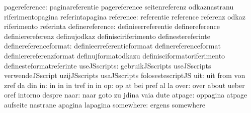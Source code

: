                    pagereference: paginareferentie                 pagereference
                                  seitenreferenz                   odkaznastranu
                                  riferimentopagina                referintapagina
                       reference: referentie                       reference
                                  referenz                         odkaz
                                  riferimento                      referinta
                 definereference: definieerreferentie              definereference
                                  definierereferenz                definujodkaz
                                  definisciriferimento             definestereferinte
           definereferenceformat: definieerreferentieformaat       definereferenceformat
                                  definierereferenzformat          definujformatodkazu
                                  definisciformatoriferimento      definesteformatreferinte
                    useJSscripts: gebruikJSscripts                 useJSscripts
                                  verwendeJSscript                 uzijJSscripts
                                  usaJSscripts                     folosestescriptJS
                             uit: uit                              from
                                  von                              zref
                                  da                               din
                              in: in                               in
                                  in                               tref
                                  in                               in
                              op: op                               at
                                  bei                              pref
                                  al                               la %
                            over: over                             about
                                  ueber                            oref
                                  intorno                          despre
                            naar: naar                             goto
                                  zu                               jdina
                                  vaia                             dute
                          atpage: oppagina                         atpage
                                  aufseite                         nastrane
                                  apagina                          lapagina
                       somewhere: ergens                           somewhere
